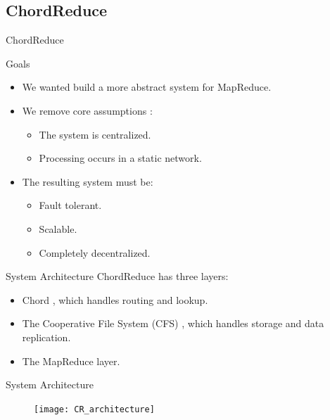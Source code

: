 \documentclass[11pt]{beamer}
\begin{document}
\subsection{ChordReduce}

\begin{frame}{ChordReduce}

\end{frame}



\begin{frame}{Goals}

	\begin{itemize}
		\item We wanted build a more abstract system for MapReduce.
		\item We remove core assumptions \cite{hadoopAssumptions}:
		\begin{itemize}
			\item The system is centralized.
			\item Processing occurs in a static network.
		\end{itemize}
		\item The resulting system must be:
		\begin{itemize}
			\item Fault tolerant.
			\item Scalable.
			\item Completely decentralized.
		\end{itemize}
	\end{itemize}

\end{frame}



\begin{frame}{System Architecture}
	ChordReduce has three layers:
	\begin{itemize}
		\item Chord \cite{Chord}, which handles routing and lookup.
		\item The Cooperative File System (CFS) \cite{CFS}, which handles storage and data replication.
		\item The MapReduce layer.
	\end{itemize}

\end{frame}



\begin{frame}{System Architecture}
	\begin{figure}
	    \texttt{[image: CR\_architecture]}
	
	\end{figure}
\end{frame}
\end{document}
